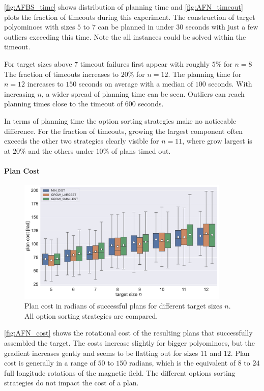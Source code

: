 \autoref{fig:AFBS_time} shows distribution of planning time and \autoref{fig:AFN_timeout} plots the fraction of timeouts during this experiment.
The construction of target polyominoes with sizes $5$ to $7$ can be planned in under $30$ seconds with just a few outliers exceeding this time.
Note the all instances could be solved within the timeout.

For target sizes above $7$ timeout failures first appear with roughly $5\%$ for $n = 8$
The fraction of timeouts increases to $20\%$ for $n=12$.
The planning time for $n = 12$ increases to $150$ seconds on average with a median of $100$ seconds.
With increasing $n$, a wider spread of planning time can be seen.
Outliers can reach planning times close to the timeout of $600$ seconds.

In terms of planning time the option sorting strategies make no noticeable difference.
For the fraction of timeouts, growing the largest component often exceeds the other two strategies clearly visible for $n=11$, where grow largest is at $20\%$ and the others under $10\%$ of plans timed out.


\paragraph{Plan Cost}

\begin{figure}
	\centering
	\includegraphics[width=0.9\textwidth]{figures/plots/AFN_cost.pdf}
	\caption[Plan cost for different target sizes]{Plan cost in radians of successful plans for different target sizes $n$. All option sorting strategies are compared.}
	\label{fig:AFN_cost}
\end{figure}

\autoref{fig:AFN_cost} shows the rotational cost of the resulting plans that successfully assembled the target.
The costs increase slightly for bigger polyominoes, but the gradient increases gently and seems to be flatting out for sizes $11$ and $12$.
Plan cost is generally in a range of $50$ to $150$ radians, which is the equivalent of $8$ to $24$ full longitude rotations of the magnetic field.
The different options sorting strategies do not impact the cost of a plan.

